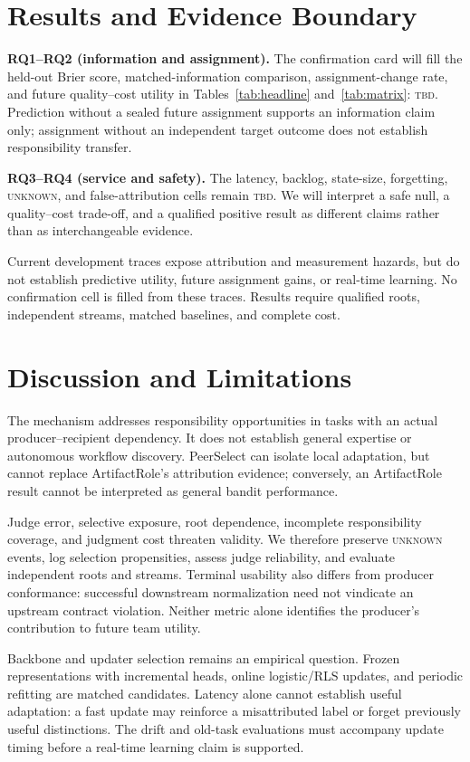 \documentclass[sigconf,anonymous]{aamas}
\newcommand{\unknown}{\textsc{unknown}}
\begin{document}
\section{Results and Evidence Boundary}
\label{sec:current}

\textbf{RQ1--RQ2 (information and assignment).} The confirmation card will fill the held-out Brier score, matched-information comparison, assignment-change rate, and future quality--cost utility in Tables~\ref{tab:headline} and~\ref{tab:matrix}: \textsc{tbd}. Prediction without a sealed future assignment supports an information claim only; assignment without an independent target outcome does not establish responsibility transfer.

\textbf{RQ3--RQ4 (service and safety).} The latency, backlog, state-size, forgetting, \unknown{}, and false-attribution cells remain \textsc{tbd}. We will interpret a safe null, a quality--cost trade-off, and a qualified positive result as different claims rather than as interchangeable evidence.

Current development traces expose attribution and measurement hazards, but do not establish predictive utility, future assignment gains, or real-time learning. No confirmation cell is filled from these traces. Results require qualified roots, independent streams, matched baselines, and complete cost.

\section{Discussion and Limitations}

The mechanism addresses responsibility opportunities in tasks with an actual producer--recipient dependency. It does not establish general expertise or autonomous workflow discovery. PeerSelect can isolate local adaptation, but cannot replace ArtifactRole's attribution evidence; conversely, an ArtifactRole result cannot be interpreted as general bandit performance.

Judge error, selective exposure, root dependence, incomplete responsibility coverage, and judgment cost threaten validity. We therefore preserve \unknown{} events, log selection propensities, assess judge reliability, and evaluate independent roots and streams. Terminal usability also differs from producer conformance: successful downstream normalization need not vindicate an upstream contract violation. Neither metric alone identifies the producer's contribution to future team utility.

Backbone and updater selection remains an empirical question. Frozen representations with incremental heads, online logistic/RLS updates, and periodic refitting are matched candidates. Latency alone cannot establish useful adaptation: a fast update may reinforce a misattributed label or forget previously useful distinctions. The drift and old-task evaluations must accompany update timing before a real-time learning claim is supported.
\end{document}
